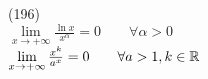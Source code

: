 (196)\\
$\lim\limits_{x\to +\infty} \frac{\ln x}{x^\alpha} = 0 \qquad \forall\alpha > 0$\\
$\lim\limits_{x\to +\infty} \frac{x^k}{a^x} = 0 \qquad \forall a > 1, k \in \mathbb{R}$
